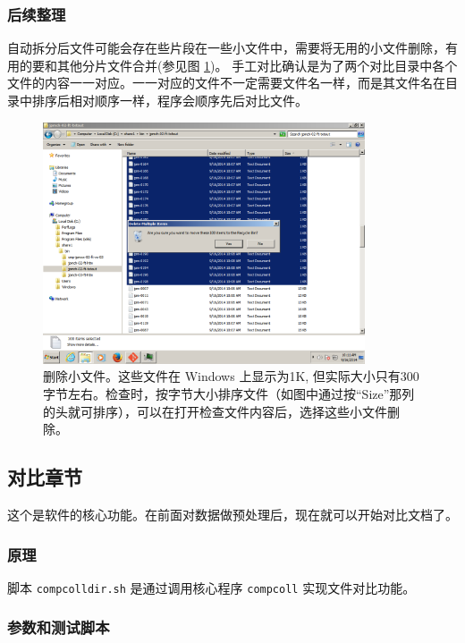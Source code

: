 \documentclass{article}
\begin{document}
\subsubsection{后续整理}

自动拆分后文件可能会存在些片段在一些小文件中，需要将无用的小文件删除，有用的要和其他分片文件合并(参见图 \ref{fig:deletesmall})。
手工对比确认是为了两个对比目录中各个文件的内容一一对应。一一对应的文件不一定需要文件名一样，而是其文件名在目录中排序后相对顺序一样，程序会顺序先后对比文件。


\begin{figure}[ht]\centering
  \includegraphics[width=0.85\textwidth]{figures/delete-trash.png}
  \caption{删除小文件。这些文件在 Windows 上显示为1K, 但实际大小只有300字节左右。检查时，按字节大小排序文件（如图中通过按``Size''那列的头就可排序），可以在打开检查文件内容后，选择这些小文件删除。}\label{fig:deletesmall}
\end{figure}


\clearpage

\subsection{对比章节} \label{chap:compcoll}

这个是软件的核心功能。在前面对数据做预处理后，现在就可以开始对比文档了。

\subsubsection{原理}

脚本 \texttt{compcolldir.sh} 是通过调用核心程序 \texttt{compcoll} 实现文件对比功能。


\subsubsection{参数和测试脚本}
\end{document}
